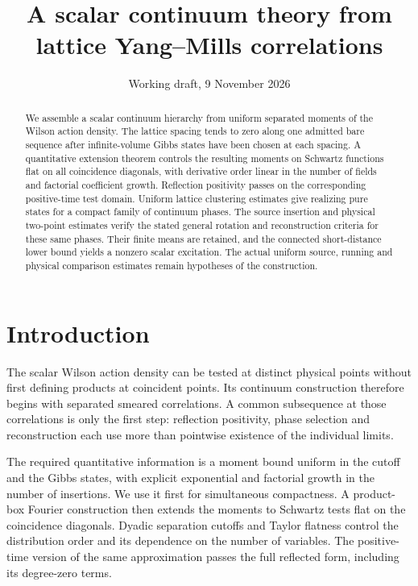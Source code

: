\documentclass[11pt,letterpaper,reqno]{amsart}
\title[Scalar continuum theory]{A scalar continuum theory from lattice Yang--Mills correlations}
\date{Working draft, 9 November 2026}
\numberwithin{equation}{section}
\theoremstyle{definition}
\theoremstyle{remark}
\begin{document}
\raggedbottom
\begin{abstract}
We assemble a scalar continuum hierarchy from uniform separated
moments of the Wilson action density. The lattice spacing tends
to zero along one admitted bare sequence after infinite-volume
Gibbs states have been chosen at each spacing. A quantitative
extension theorem controls the resulting moments on Schwartz
functions flat on all coincidence diagonals, with derivative
order linear in the number of fields and factorial coefficient
growth. Reflection positivity passes on the corresponding
positive-time test domain. Uniform lattice clustering estimates
give realizing pure states for a compact family of continuum
phases. The source insertion and physical two-point estimates
verify the stated general rotation and reconstruction criteria
for these same phases. Their finite means are retained, and the
connected short-distance lower bound yields a nonzero scalar
excitation. The actual uniform source, running and physical
comparison estimates remain hypotheses of the construction.
\end{abstract}
\maketitle
\tableofcontents

\section{Introduction}

The scalar Wilson action density can be tested at distinct
physical points without first defining products at coincident
points. Its continuum construction therefore begins with
separated smeared correlations. A common subsequence at those
correlations is only the first step: reflection positivity,
phase selection and reconstruction each use more than
pointwise existence of the individual limits.

The required quantitative information is a moment bound
uniform in the cutoff and the Gibbs states, with explicit
exponential and factorial growth in the number of insertions.
We use it first for simultaneous compactness.
A product-box Fourier construction then extends the moments
to Schwartz tests flat on the coincidence diagonals. Dyadic
separation cutoffs and Taylor flatness control the distribution
order and its dependence on the number of variables. The
positive-time version of the same approximation passes the
full reflected form, including its degree-zero terms.
\end{document}
